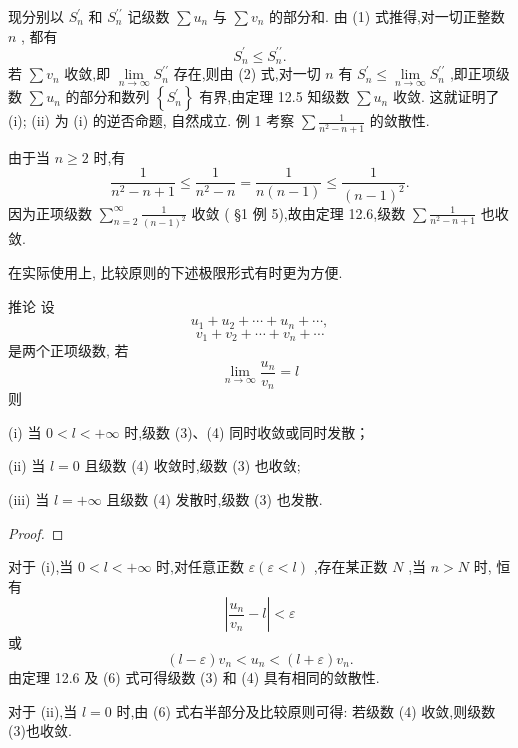 现分别以 \({S}_{n}^{\prime }\) 和 \({S}_{n}^{\prime \prime }\) 记级数 \(\sum {u}_{n}\) 与 \(\sum {v}_{n}\) 的部分和. 由 (1) 式推得,对一切正整数 \(n\) , 都有
\[
{S}_{n}^{\prime } \leq  {S}_{n}^{\prime \prime }. \tag{2}
\]
若 \(\sum {v}_{n}\) 收敛,即 \(\mathop{\lim }\limits_{{n \rightarrow  \infty }}{S}_{n}^{\prime \prime }\) 存在,则由 (2) 式,对一切 \(n\) 有 \({S}_{n}^{\prime } \leq  \mathop{\lim }\limits_{{n \rightarrow  \infty }}{S}_{n}^{\prime \prime }\) ,即正项级数 \(\sum {u}_{n}\) 的部分和数列 \(\left\{  {S}_{n}^{\prime }\right\}\) 有界,由定理 12.5 知级数 \(\sum {u}_{n}\) 收敛. 这就证明了 (i); (ii) 为 (i) 的逆否命题, 自然成立. 例 1 考察 \(\sum \frac{1}{{n}^{2} - n + 1}\) 的敛散性.

\begin{solution}

\end{solution}
由于当 \(n \geq  2\) 时,有
\[
\frac{1}{{n}^{2} - n + 1} \leq  \frac{1}{{n}^{2} - n} = \frac{1}{n\left( {n - 1}\right) } \leq  \frac{1}{{\left( n - 1\right) }^{2}}.
\]
因为正项级数 \(\mathop{\sum }\limits_{{n = 2}}^{\infty }\frac{1}{{\left( n - 1\right) }^{2}}\) 收敛 ( §1 例 5),故由定理 12.6,级数 \(\sum \frac{1}{{n}^{2} - n + 1}\) 也收敛.

在实际使用上, 比较原则的下述极限形式有时更为方便.

推论 设
\[
{u}_{1} + {u}_{2} + \cdots  + {u}_{n} + \cdots , \tag{3}
\]
\[
{v}_{1} + {v}_{2} + \cdots  + {v}_{n} + \cdots  \tag{4}
\]
是两个正项级数, 若
\[
\mathop{\lim }\limits_{{n \rightarrow  \infty }}\frac{{u}_{n}}{{v}_{n}} = l \tag{5}
\]
则

(i) 当 \(0 < l <  + \infty\) 时,级数 (3)、(4) 同时收敛或同时发散；

(ii) 当 \(l = 0\) 且级数 (4) 收敛时,级数 (3) 也收敛;

(iii) 当 \(l =  + \infty\) 且级数 (4) 发散时,级数 (3) 也发散.

\begin{proof}

\end{proof}
对于 (i),当 \(0 < l <  + \infty\) 时,对任意正数 \(\varepsilon \left( {\varepsilon  < l}\right)\) ,存在某正数 \(N\) ,当 \(n > N\) 时, 恒有
\[
\left| {\frac{{u}_{n}}{{v}_{n}} - l}\right|  < \varepsilon
\]
或
\[
\left( {l - \varepsilon }\right) {v}_{n} < {u}_{n} < \left( {l + \varepsilon }\right) {v}_{n}. \tag{6}
\]
由定理 12.6 及 (6) 式可得级数 (3) 和 (4) 具有相同的敛散性.

对于 (ii),当 \(l = 0\) 时,由 (6) 式右半部分及比较原则可得: 若级数 (4) 收敛,则级数 (3)也收敛.

